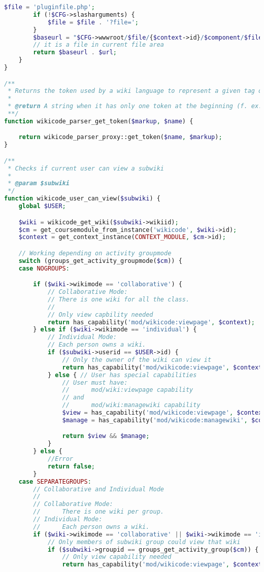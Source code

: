 \begin{lstlisting}[language=PHP]
        $file = 'pluginfile.php';
        if (!$CFG->slasharguments) {
            $file = $file . '?file=';
        }
        $baseurl = "$CFG->wwwroot/$file/{$context->id}/$component/$filearea/$swid/";
        // it is a file in current file area
        return $baseurl . $url;
    }
}

/**
 * Returns the token used by a wiki language to represent a given tag or "object" (bold -> **)
 *
 * @return A string when it has only one token at the beginning (f. ex. lists). An array composed by 2 strings when it has 2 tokens, one at the beginning and one at the end (f. ex. italics). Returns false otherwise.
 **/
function wikicode_parser_get_token($markup, $name) {

    return wikicode_parser_proxy::get_token($name, $markup);
}

/**
 * Checks if current user can view a subwiki
 *
 * @param $subwiki
 */
function wikicode_user_can_view($subwiki) {
    global $USER;

    $wiki = wikicode_get_wiki($subwiki->wikiid);
    $cm = get_coursemodule_from_instance('wikicode', $wiki->id);
    $context = get_context_instance(CONTEXT_MODULE, $cm->id);

    // Working depending on activity groupmode
    switch (groups_get_activity_groupmode($cm)) {
    case NOGROUPS:

        if ($wiki->wikimode == 'collaborative') {
            // Collaborative Mode:
            // There is one wiki for all the class.
            //
            // Only view capbility needed
            return has_capability('mod/wikicode:viewpage', $context);
        } else if ($wiki->wikimode == 'individual') {
            // Individual Mode:
            // Each person owns a wiki.
            if ($subwiki->userid == $USER->id) {
                // Only the owner of the wiki can view it
                return has_capability('mod/wikicode:viewpage', $context);
            } else { // User has special capabilities
                // User must have:
                //      mod/wiki:viewpage capability
                // and
                //      mod/wiki:managewiki capability
                $view = has_capability('mod/wikicode:viewpage', $context);
                $manage = has_capability('mod/wikicode:managewiki', $context);

                return $view && $manage;
            }
        } else {
            //Error
            return false;
        }
    case SEPARATEGROUPS:
        // Collaborative and Individual Mode
        //
        // Collaborative Mode:
        //      There is one wiki per group.
        // Individual Mode:
        //      Each person owns a wiki.
        if ($wiki->wikimode == 'collaborative' || $wiki->wikimode == 'individual') {
            // Only members of subwiki group could view that wiki
            if ($subwiki->groupid == groups_get_activity_group($cm)) {
                // Only view capability needed
                return has_capability('mod/wikicode:viewpage', $context);


\end{lstlisting}
